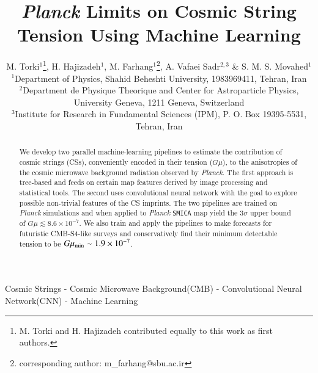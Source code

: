 \documentclass[fleqn,usenatbib]{mnras}
\title[CS detection by ML]{{\it Planck} Limits on  Cosmic String Tension Using Machine Learning}
\author[Torki et al.]{
M. Torki$^1$\thanks{M. Torki and H. Hajizadeh contributed equally to this work as first authors.},
H. Hajizadeh$^1$\footnotemark[1],
M. Farhang$^1$\thanks{corresponding author: m\_farhang$@$sbu.ac.ir},
A. Vafaei Sadr$^{2,3}$ \&
S. M. S. Movahed$^{1}$
\\
$^{1}$Department of Physics, Shahid Beheshti University,  1983969411, Tehran, Iran\\
$^{2}$Department de Physique Theorique and Center for Astroparticle Physics, University Geneva, 1211 Geneva, Switzerland\\
$^{3}$Institute for Research in Fundamental Sciences (IPM), P. O. Box 19395-5531, Tehran, Iran
}
\begin{document}
\label{firstpage}
\pagerange{\pageref{firstpage}--\pageref{lastpage}}
\maketitle

\begin{abstract}
We develop two parallel machine-learning pipelines to estimate the contribution of cosmic strings (CSs), conveniently encoded in  their tension ($G\mu$), to the anisotropies of the cosmic microwave background radiation observed by {\it Planck}. 
The first approach is tree-based and feeds on certain map features derived by image processing and statistical tools. The second uses convolutional neural network with the goal to explore possible non-trivial features of the CS imprints. 
The two pipelines are trained on {\it Planck} simulations and when applied to {\it Planck} \texttt{SMICA} map yield the $3\sigma$ upper bound of $G\mu\lesssim 8.6\times 10^{-7}$. 
We also train and apply the pipelines to make forecasts for futuristic CMB-S4-like surveys and conservatively find their minimum detectable tension to be $G\mu_{\rm min}\sim 1.9\times 10^{-7}$.
\end{abstract}


\begin{keywords}
Cosmic Strings - Cosmic Microwave Background(CMB) - Convolutional Neural Network(CNN) - Machine Learning

\end{keywords}

\end{document}
